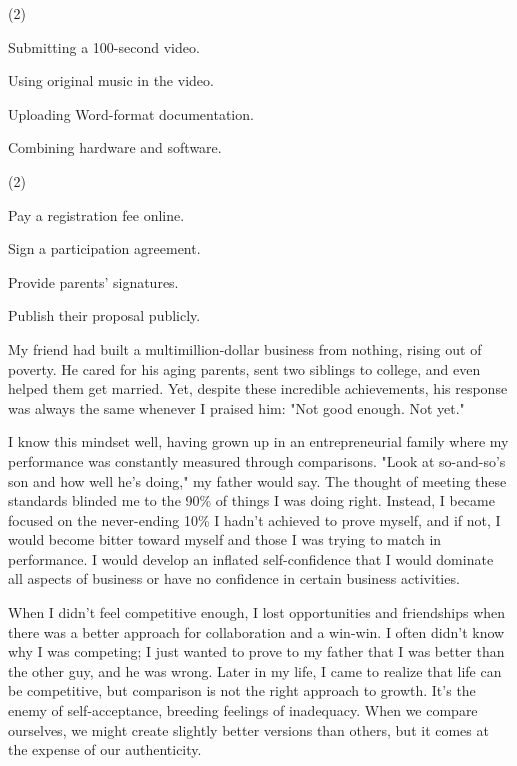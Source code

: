 \documentclass{英语试卷}
\begin{document}
\begin{choices}(2)
  \item Submitting a 100-second video.
  \item Using original music in the video.
  \item Uploading Word-format documentation.
  \item Combining hardware and software.
\end{choices}
\begin{choices}(2)
  \item Pay a registration fee online.
  \item Sign a participation agreement.
  \item Provide parents' signatures.
  \item Publish their proposal publicly.
\end{choices}
\par My friend had built a multimillion-dollar business from nothing, rising out of poverty. He cared for his aging parents, sent two siblings to college, and even helped them get married. Yet, despite these incredible achievements, his response was always the same whenever I praised him: "Not good enough. Not yet."\par
\par I know this mindset well, having grown up in an entrepreneurial family where my performance was constantly measured through comparisons. "Look at so-and-so's son and how well he's doing," my father would say. The thought of meeting these standards blinded me to the 90\% of things I was doing right. Instead, I became focused on the never-ending 10\% I hadn't achieved to prove myself, and if not, I would become bitter toward myself and those I was trying to match in performance. I would develop an inflated self-confidence that I would dominate all aspects of business or have no confidence in certain business activities.\par
\par When I didn't feel competitive enough, I lost opportunities and friendships when there was a better approach for collaboration and a win-win. I often didn't know why I was competing; I just wanted to prove to my father that I was better than the other guy, and he was wrong. Later in my life, I came to realize that life can be competitive, but comparison is not the right approach to growth. It's the enemy of self-acceptance, breeding feelings of inadequacy. When we compare ourselves, we might create slightly better versions than others, but it comes at the expense of our authenticity.\par
\end{document}
